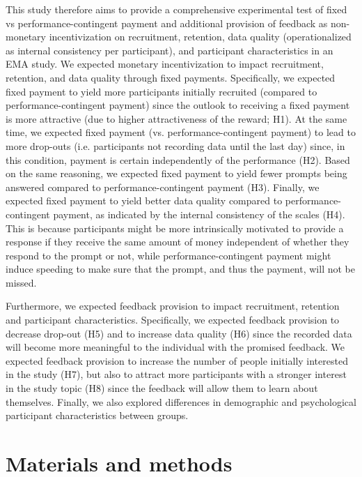\documentclass[authordate, empirical,issue]{jote-new-article}
\begin{document}
	This study therefore aims to provide a comprehensive experimental test of fixed vs performance-contingent payment and additional provision of feedback as non-monetary incentivization on recruitment, retention, data quality (operationalized as internal consistency per participant), and participant characteristics in an EMA study. We expected monetary incentivization to impact recruitment, retention, and data quality through fixed payments. Specifically, we expected fixed payment to yield more participants initially recruited (compared to performance-contingent payment) since the outlook to receiving a fixed payment is more attractive (due to higher attractiveness of the reward; H1). At the same time, we expected fixed payment (vs. performance-contingent payment) to lead to more drop-outs (i.e. participants not recording data until the last day) since, in this condition, payment is certain independently of the performance (H2). Based on the same reasoning, we expected fixed payment to yield fewer prompts being answered compared to performance-contingent payment (H3). Finally, we expected fixed payment to yield better data quality compared to performance-contingent payment, as indicated by the internal consistency of the scales (H4). This is because participants might be more intrinsically motivated to provide a response if they receive the same amount of money independent of whether they respond to the prompt or not, while performance-contingent payment might induce speeding to make sure that the prompt, and thus the payment, will not be missed.



	Furthermore, we expected feedback provision to impact recruitment, retention and participant characteristics. Specifically, we expected feedback provision to decrease drop-out (H5) and to increase data quality (H6) since the recorded data will become more meaningful to the individual with the promised feedback. We expected feedback provision to increase the number of people initially interested in the study (H7), but also to attract more participants with a stronger interest in the study topic (H8) since the feedback will allow them to learn about themselves. Finally, we also explored differences in demographic and psychological participant characteristics between groups.



	\section{Materials and methods}
\end{document}

